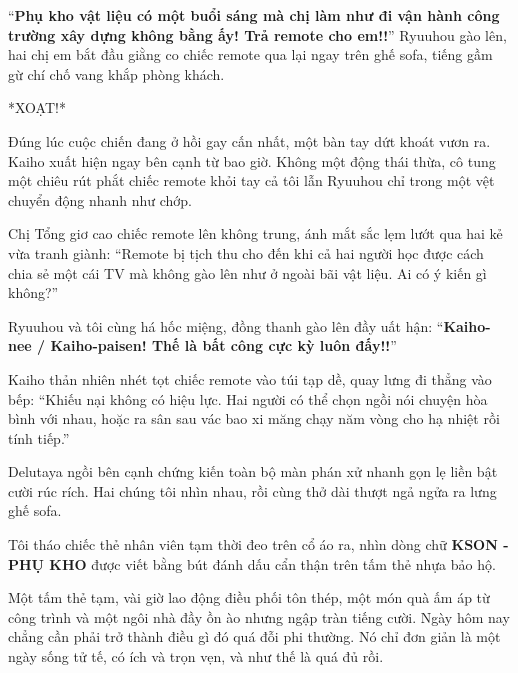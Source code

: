 ﻿\documentclass[../main.tex]{subfiles}
\begin{document}
``\textbf{Phụ kho vật liệu có một buổi sáng mà chị làm như đi vận hành công trường xây dựng không bằng ấy! Trả remote cho em!!}'' Ryuuhou gào lên, hai chị em bắt đầu giằng co chiếc remote qua lại ngay trên ghế sofa, tiếng gầm gừ chí chố vang khắp phòng khách.

*XOẠT!*

Đúng lúc cuộc chiến đang ở hồi gay cấn nhất, một bàn tay dứt khoát vươn ra. Kaiho xuất hiện ngay bên cạnh từ bao giờ. Không một động thái thừa, cô tung một chiêu rút phắt chiếc remote khỏi tay cả tôi lẫn Ryuuhou chỉ trong một vệt chuyển động nhanh như chớp.

Chị Tổng giơ cao chiếc remote lên không trung, ánh mắt sắc lẹm lướt qua hai kẻ vừa tranh giành: ``Remote bị tịch thu cho đến khi cả hai người học được cách chia sẻ một cái TV mà không gào lên như ở ngoài bãi vật liệu. Ai có ý kiến gì không?''

Ryuuhou và tôi cùng há hốc miệng, đồng thanh gào lên đầy uất hận: ``\textbf{Kaiho-nee / Kaiho-paisen! Thế là bất công cực kỳ luôn đấy!!}''

Kaiho thản nhiên nhét tọt chiếc remote vào túi tạp dề, quay lưng đi thẳng vào bếp: ``Khiếu nại không có hiệu lực. Hai người có thể chọn ngồi nói chuyện hòa bình với nhau, hoặc ra sân sau vác bao xi măng chạy năm vòng cho hạ nhiệt rồi tính tiếp.''

Delutaya ngồi bên cạnh chứng kiến toàn bộ màn phán xử nhanh gọn lẹ liền bật cười rúc rích. Hai chúng tôi nhìn nhau, rồi cùng thở dài thượt ngả ngửa ra lưng ghế sofa.

Tôi tháo chiếc thẻ nhân viên tạm thời đeo trên cổ áo ra, nhìn dòng chữ \textbf{KSON - PHỤ KHO} được viết bằng bút đánh dấu cẩn thận trên tấm thẻ nhựa bảo hộ.

Một tấm thẻ tạm, vài giờ lao động điều phối tôn thép, một món quà ấm áp từ công trình và một ngôi nhà đầy ồn ào nhưng ngập tràn tiếng cười. Ngày hôm nay chẳng cần phải trở thành điều gì đó quá đỗi phi thường. Nó chỉ đơn giản là một ngày sống tử tế, có ích và trọn vẹn, và như thế là quá đủ rồi.
\end{document}
